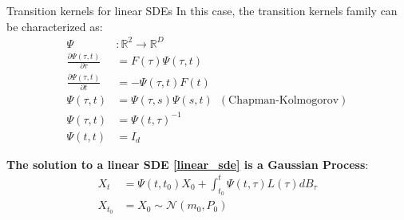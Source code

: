 \begin{frame}{Transition kernels for linear SDEs}
In this case, the transition kernels family can be characterized as:
\begin{align}
    \Psi &: \mathbb{R}^{2 } \rightarrow \mathbb{R}^{D} \\
    \frac{\partial \Psi (\tau, t)}{\partial \tau} &= F(\tau) \Psi(\tau, t) \\
    \frac{\partial \Psi (\tau, t)}{\partial t} &= - \Psi(\tau, t) F(t)  \\
    \Psi(\tau, t) &= \Psi(\tau, s) \Psi(s, t) \,\,\, (\text{Chapman-Kolmogorov}) \\
    \Psi(\tau, t) &= \Psi(t, \tau)^{-1} \\ 
    \Psi(t,t) &= I_d
\end{align}

\textbf{The solution to a linear SDE \ref{linear_sde} is a Gaussian Process}:
\begin{align}
    \label{solution_linear_sde}
    X_t &= \Psi(t,t_0) X_0 + \int_{t_0}^{t} \Psi(t, \tau) L(\tau) dB_{\tau} \\
    X_{t_0} &= X_0 \sim \mathcal{N}(m_0, P_0)
\end{align}
\end{frame}

